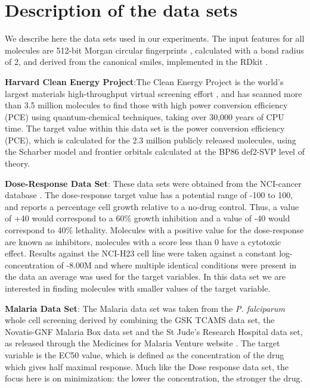 \section{Description of the data sets}

We describe here the data sets used in our experiments. The input features for all molecules are 512-bit Morgan circular fingerprints \cite{Rogers_2010}, calculated with a bond radius of 2, and derived from the canonical smiles, implemented in the RDkit \cite{rdkit}.

\textbf{Harvard Clean Energy Project}:The Clean Energy Project is the world's largest materials high-throughput virtual screening effort \cite{Hachmann_2014,Hachmann_2011}, and has scanned more than 3.5 million molecules to find those with high power conversion efficiency (PCE) using quantum-chemical techniques, taking over 30,000 years of CPU time. The target value within this data set is the power conversion efficiency (PCE), which is calculated for the 2.3 million publicly released molecules, using the Scharber model \cite{Dennler_2008} and frontier orbitals calculated at the BP86 \cite{Perdew_1986,Becke_1993} \/ def2-SVP \cite{Weigend_2005} level of theory.

\textbf{Dose-Response Data Set}: These data sets were obtained from the NCI-cancer database \cite{_nci_}.  The dose-response target value has a potential range of -100 to 100, and reports a percentage cell growth relative to a no-drug control.  Thus, a value of +40 would correspond to a 60\% growth inhibition and a value of -40 would correspond to 40\% lethality.  Molecules with a positive value for the dose-response are known as inhibitors, molecules with a score less than 0 have a cytotoxic effect. Results against the NCI-H23 cell line were taken against a constant log-concentration of -8.00M and where multiple identical conditions were present in the data an average was used for the target variables. In this data set we are interested in finding molecules with  smaller values of the target variable.

\textbf{Malaria Data Set}: The Malaria data set was taken from the \textit{P. falciparum} whole cell screening derived by combining the GSK TCAMS data set, the Novatis-GNF Malaria Box data set and the St Jude's Research Hospital data set, as released through the Medicines for Malaria Venture website \cite{Spangenberg_2013}. The target variable is the EC50 value, which is defined as the concentration of the drug which gives half maximal response. Much like the Dose response data set, the focus here is on minimization: the lower the concentration, the stronger the drug.
